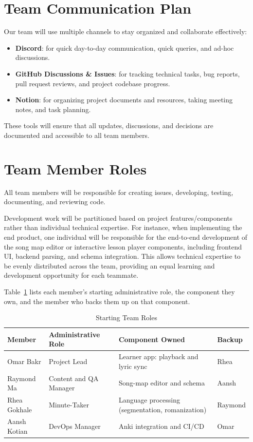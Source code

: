 \documentclass{article}
\begin{document}
\section{Team Communication Plan}

Our team will use multiple channels to stay organized and collaborate effectively:
\begin{itemize}
    \item \textbf{Discord}: for quick day-to-day communication, quick queries, and ad-hoc discussions.
    \item \textbf{GitHub Discussions \& Issues}: for tracking technical tasks, bug reports, pull request reviews, and project codebase progress.
    \item \textbf{Notion}: for organizing project documents and resources, taking meeting notes, and task planning.
\end{itemize}
These tools will ensure that all updates, discussions, and decisions are documented and accessible to all team members.

\section{Team Member Roles}

All team members will be responsible for creating issues, developing, testing, documenting, and reviewing code.

\vspace{1em}

Development work will be partitioned based on project features/components rather than individual technical expertise. For instance, when implementing the end product, one individual will be responsible for the end-to-end development of the song map editor or interactive lesson player components, including frontend UI, backend parsing, and schema integration. This allows technical expertise to be evenly distributed across the team, providing an equal learning and development opportunity for each teammate.

Table~\ref{TblRoles} lists each member's starting administrative role, the
component they own, and the member who backs them up on that component.

\begin{table}[h!]
\caption{Starting Team Roles} \label{TblRoles}
\begin{tabularx}{\textwidth}{l>{\raggedright\arraybackslash}X>{\raggedright\arraybackslash}Xl}
\toprule
\textbf{Member} & \textbf{Administrative Role} & \textbf{Component Owned} & \textbf{Backup}\\
\midrule
Omar Bakr & Project Lead & Learner app: playback and lyric sync & Rhea\\
Raymond Ma & Content and QA Manager & Song-map editor and schema & Aansh\\
Rhea Gokhale & Minute-Taker & Language processing (segmentation, romanization) & Raymond\\
Aansh Kotian & DevOps Manager & Anki integration and CI/CD & Omar\\
\bottomrule
\end{tabularx}
\end{table}
\end{document}
